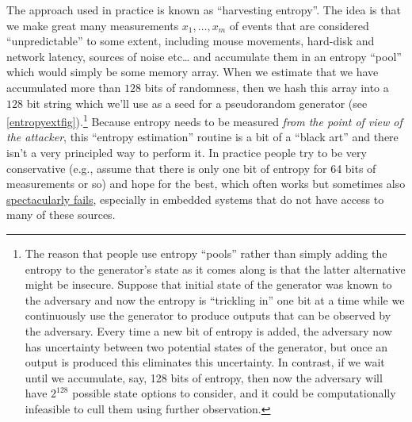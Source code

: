 The approach used in practice is known as ``harvesting entropy''. The
idea is that we make great many measurements \(x_1,\ldots,x_m\) of
events that are considered ``unpredictable'' to some extent, including
mouse movements, hard-disk and network latency, sources of noise
etc\ldots{} and accumulate them in an entropy ``pool'' which would
simply be some memory array. When we estimate that we have accumulated
more than \(128\) bits of randomness, then we hash this array into a
\(128\) bit string which we'll use as a seed for a pseudorandom
generator (see \cref{entropyextfig}).\footnote{The reason that people
  use entropy ``pools'' rather than simply adding the entropy to the
  generator's state as it comes along is that the latter alternative
  might be insecure. Suppose that initial state of the generator was
  known to the adversary and now the entropy is ``trickling in'' one bit
  at a time while we continuously use the generator to produce outputs
  that can be observed by the adversary. Every time a new bit of entropy
  is added, the adversary now has uncertainty between two potential
  states of the generator, but once an output is produced this
  eliminates this uncertainty. In contrast, if we wait until we
  accumulate, say, 128 bits of entropy, then now the adversary will have
  \(2^{128}\) possible state options to consider, and it could be
  computationally infeasible to cull them using further observation.}
Because entropy needs to be measured \emph{from the point of view of the
attacker}, this ``entropy estimation'' routine is a bit of a ``black
art'' and there isn't a very principled way to perform it. In practice
people try to be very conservative (e.g., assume that there is only one
bit of entropy for 64 bits of measurements or so) and hope for the best,
which often works but sometimes also
\href{https://factorable.net/paper.html}{spectacularly fails},
especially in embedded systems that do not have access to many of these
sources.

